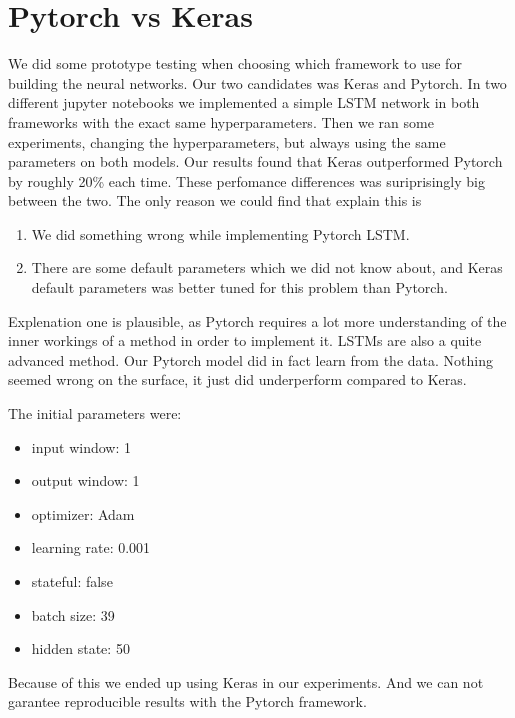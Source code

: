 \section{Pytorch vs Keras}
\label{section:method:pytorch-vs-keras}
We did some prototype testing when choosing which framework to use for
building the neural networks.
Our two candidates was Keras and Pytorch.
In two different jupyter notebooks
we implemented a simple LSTM network in both frameworks with the exact same
hyperparameters. Then we ran some experiments, changing the hyperparameters,
but always using the same parameters on both models.
Our results found that Keras outperformed Pytorch by roughly 20\% each time.
These perfomance differences was suriprisingly big between the two.
The only reason we could find that explain this is
\begin{enumerate}
  \item We did something wrong while implementing Pytorch LSTM.
  \item There are some default parameters which we did not know about, and Keras
        default parameters was better tuned for this problem than Pytorch.
\end{enumerate}
Explenation one is plausible, as Pytorch requires a lot more understanding
of the inner workings of a method in order to implement it.
LSTMs are also a quite advanced method. Our Pytorch model did in fact learn
from the data. Nothing seemed wrong on the surface, it just did underperform compared to Keras.

The initial parameters were:
\begin{itemize}
  \item input window: 1
  \item output window: 1
  \item optimizer: Adam
  \item learning rate: 0.001
  \item stateful: false
  \item batch size: 39
  \item hidden state: 50
\end{itemize}
Because of this we ended up using Keras in our experiments. And we can not
garantee reproducible results with the Pytorch framework.